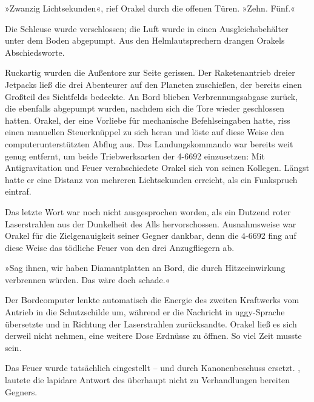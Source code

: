 »Zwanzig Lichtsekunden«, rief Orakel durch die offenen Türen. »Zehn. Fünf.«

Die Schleuse wurde verschlossen; die Luft wurde in einen Ausgleichsbehälter unter dem Boden abgepumpt. Aus den Helmlautsprechern drangen Orakels Abschiedsworte.


Ruckartig wurden die Außentore zur Seite gerissen. Der Raketenantrieb dreier Jetpacks ließ die drei Abenteurer auf den Planeten zuschießen, der bereits einen Großteil des Sichtfelds bedeckte. An Bord blieben Verbrennungsabgase zurück, die ebenfalls abgepumpt wurden, nachdem sich die Tore wieder geschlossen hatten. Orakel, der eine Vorliebe für mechanische Befehlseingaben hatte, riss einen manuellen Steuerknüppel zu sich heran und löste auf diese Weise den computerunterstützten Abflug aus. Das Landungskommando war bereits weit genug entfernt, um beide Triebwerksarten der 4-6692 einzusetzen: Mit Antigravitation und Feuer verabschiedete Orakel sich von seinen Kollegen. Längst hatte er eine Distanz von mehreren Lichtsekunden erreicht, als ein Funkspruch eintraf.


Das letzte Wort war noch nicht ausgesprochen worden, als ein Dutzend roter Laserstrahlen aus der Dunkelheit des Alls hervorschossen. Ausnahmsweise war Orakel für die Zielgenauigkeit seiner Gegner dankbar, denn die 4-6692 fing auf diese Weise das tödliche Feuer von den drei Anzugfliegern ab.

»Sag ihnen, wir haben Diamantplatten an Bord, die durch Hitzeeinwirkung verbrennen würden. Das wäre doch schade.«

Der Bordcomputer lenkte automatisch die Energie des zweiten Kraftwerks vom Antrieb in die Schutzschilde um, während er die Nachricht in uggy-Sprache übersetzte und in Richtung der Laserstrahlen zurücksandte. Orakel ließ es sich derweil nicht nehmen, eine weitere Dose Erdnüsse zu öffnen. So viel Zeit musste sein.

Das Feuer wurde tatsächlich eingestellt – und durch Kanonenbeschuss ersetzt. , lautete die lapidare Antwort des überhaupt nicht zu Verhandlungen bereiten Gegners.


